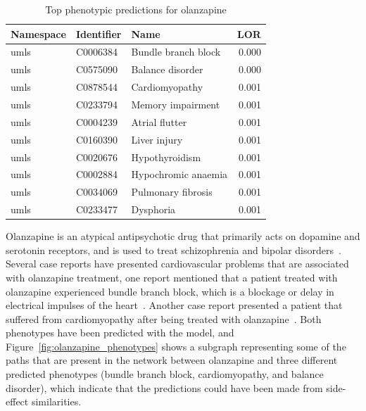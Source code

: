 \begin{table}[!ht]
    \centering
    \begin{tabular}{|l|l|l|r|}
        \hline
        \textbf{Namespace} & \textbf{Identifier} & \textbf{Name} & \textbf{LOR} \\
        \hline
        umls & C0006384 & Bundle branch block & 0.000 \\
        \hline
        umls & C0575090 & Balance disorder & 0.000 \\
        \hline
        umls & C0878544 & Cardiomyopathy & 0.001 \\
        \hline
        umls & C0233794 & Memory impairment & 0.001\\
        \hline
        umls & C0004239 & Atrial flutter & 0.001 \\
        \hline
        umls & C0160390 & Liver injury & 0.001 \\
        \hline
        umls & C0020676 & Hypothyroidism & 0.001\\
        \hline
        umls & C0002884 & Hypochromic anaemia & 0.001 \\
        \hline
        umls & C0034069 & Pulmonary fibrosis & 0.001\\
        \hline
        umls & C0233477 & Dysphoria & 0.001 \\
        \hline
    \end{tabular}
    \captionsetup{justification=centering}
    \caption{Top phenotypic predictions for olanzapine}
    \label{tab:drug_phenotype}
\end{table}

Olanzapine is an atypical antipsychotic drug that primarily acts on dopamine and serotonin receptors, and is used to treat schizophrenia and bipolar disorders~\cite{thomas_olanzapine_2019}.
Several case reports have presented cardiovascular problems that are associated with olanzapine treatment, one report mentioned that a patient treated with olanzapine experienced bundle branch block, which is a blockage or delay in electrical impulses of the heart~\cite{ninan_case_2017}.
Another case report presented a patient that suffered from cardiomyopathy after being treated with olanzapine~\cite{puttegowda_olanzapine_2016}.
Both phenotypes have been predicted with the model, and Figure~\ref{fig:olanzapine_phenotypes} shows a subgraph representing some of the paths that are present in the network between olanzapine and three different predicted phenotypes (bundle branch block, cardiomyopathy, and balance disorder), which indicate that the predictions could have been made from side-effect similarities.

